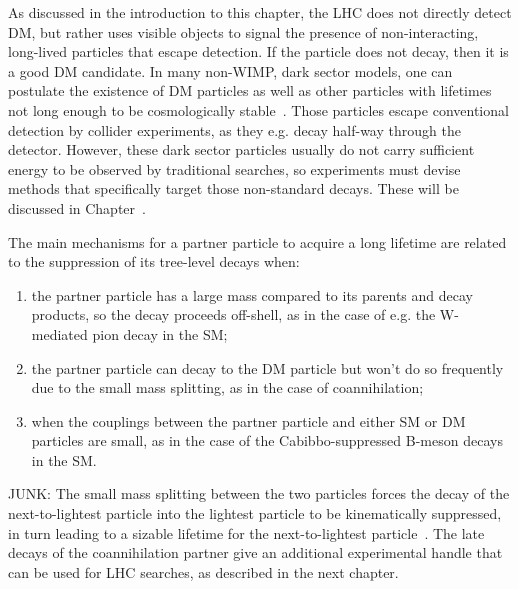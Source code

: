 As discussed in the introduction to this chapter, the LHC does not directly detect DM, but rather uses visible objects to signal the presence of non-interacting, long-lived particles that escape detection. If the particle does not decay, then it is a good DM candidate. In many non-WIMP, dark sector models, one can postulate the existence of DM particles as well as other particles with lifetimes not long enough to be cosmologically stable~\cite{Strassler:2006im}. Those particles escape conventional detection by collider experiments, as they e.g. decay half-way through the detector.
However, these dark sector particles usually do not carry sufficient energy to be observed by traditional searches, so experiments must devise methods that specifically target those non-standard decays. These will be discussed in Chapter~\cite{sec:03_ExperimentalResults}.

The main mechanisms for a partner particle to acquire a long lifetime are related to the suppression of its tree-level decays when:
\begin{enumerate}
\item the partner particle has a large mass compared to its parents and decay products, so the decay proceeds off-shell, as in the case of e.g. the W-mediated pion decay in the SM;
\item the partner particle can decay to the DM particle but won't do so frequently due to the small mass splitting, as in the case of coannihilation;
\item when the couplings between the partner particle and either SM or DM particles are small, as in the case of the Cabibbo-suppressed B-meson decays in the SM. 
\end{enumerate}

JUNK: The small mass splitting between the two particles forces the decay of the next-to-lightest particle into the lightest particle to be kinematically suppressed, in turn leading to a sizable lifetime for the next-to-lightest particle~\cite{Khoze:2017ixx}. The late decays of the coannihilation partner give an additional experimental handle that can be used for LHC searches, as described in the next chapter.  


